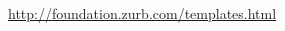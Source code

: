 \begin{thebibliography}{99999}
\singlespace\normalsize

 \url{http://foundation.zurb.com/templates.html}



\end{thebibliography}
